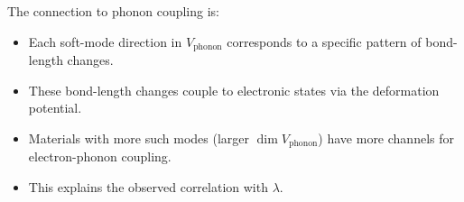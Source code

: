 \documentclass[12pt,a4paper]{article}
\begin{document}
The connection to phonon coupling is:
\begin{itemize}
\item Each soft-mode direction in $V_{\mathrm{phonon}}$ corresponds
  to a specific pattern of bond-length changes.
\item These bond-length changes couple to electronic states via the
  deformation potential.
\item Materials with more such modes (larger $\dim V_{\mathrm{phonon}}$)
  have more channels for electron-phonon coupling.
\item This explains the observed correlation with $\lambda$.
\end{itemize}
\end{document}
